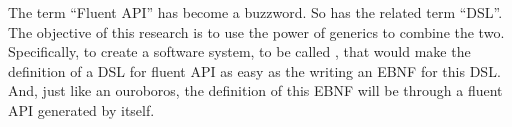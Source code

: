 The term ``Fluent API'' has become a buzzword.  So has the related term
``DSL''.  The objective of this research is to use the power of \Java generics
to combine the two.  Specifically, to create a software system, to be called
\Self, that would make the definition of a DSL for fluent API as easy as the
writing an EBNF for this DSL. And, just like an ouroboros, the definition of this
EBNF will be through a fluent API generated by \Self itself.
